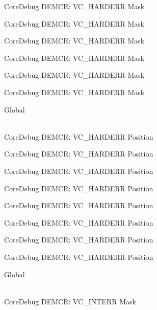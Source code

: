 \begin{DoxyRefList}
\label{deprecated__deprecated000200}%
%
Core\+Debug DEMCR\+: VC\+\_\+\+HARDERR Mask 

\label{deprecated__deprecated000275}%
%
Core\+Debug DEMCR\+: VC\+\_\+\+HARDERR Mask 

\label{deprecated__deprecated000342}%
%
Core\+Debug DEMCR\+: VC\+\_\+\+HARDERR Mask 

\label{deprecated__deprecated000418}%
%
Core\+Debug DEMCR\+: VC\+\_\+\+HARDERR Mask 

\label{deprecated__deprecated000507}%
%
Core\+Debug DEMCR\+: VC\+\_\+\+HARDERR Mask 

\label{deprecated__deprecated000609}%
%
Core\+Debug DEMCR\+: VC\+\_\+\+HARDERR Mask  
\item[{\parbox[t]{\linewidth}{Global \doxylink{group___c_m_s_i_s___core_debug_gaed9f42053031a9a30cd8054623304c0a}{Core\+Debug\+\_\+\+DEMCR\+\_\+\+VC\+\_\+\+HARDERR\+\_\+\+Pos} }}]\hfill \\
\label{deprecated__deprecated000055}%
%
Core\+Debug DEMCR\+: VC\+\_\+\+HARDERR Position 

\label{deprecated__deprecated000135}%
%
Core\+Debug DEMCR\+: VC\+\_\+\+HARDERR Position 

\label{deprecated__deprecated000199}%
%
Core\+Debug DEMCR\+: VC\+\_\+\+HARDERR Position 

\label{deprecated__deprecated000274}%
%
Core\+Debug DEMCR\+: VC\+\_\+\+HARDERR Position 

\label{deprecated__deprecated000341}%
%
Core\+Debug DEMCR\+: VC\+\_\+\+HARDERR Position 

\label{deprecated__deprecated000417}%
%
Core\+Debug DEMCR\+: VC\+\_\+\+HARDERR Position 

\label{deprecated__deprecated000506}%
%
Core\+Debug DEMCR\+: VC\+\_\+\+HARDERR Position 

\label{deprecated__deprecated000608}%
%
Core\+Debug DEMCR\+: VC\+\_\+\+HARDERR Position  
\item[{\parbox[t]{\linewidth}{Global \doxylink{group___c_m_s_i_s___core_debug_gad6815d8e3df302d2f0ff2c2c734ed29a}{Core\+Debug\+\_\+\+DEMCR\+\_\+\+VC\+\_\+\+INTERR\+\_\+\+Msk} }}]\hfill \\
\label{deprecated__deprecated000058}%
%
Core\+Debug DEMCR\+: VC\+\_\+\+INTERR Mask 


\end{DoxyRefList}
